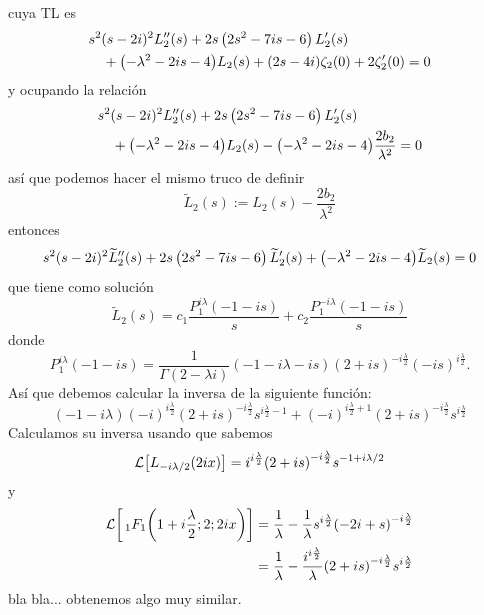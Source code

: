 \documentclass[%
 aip,
 jmp,%
 amsmath,amssymb,
 reprint,%
]{revtex4-2}
\begin{document}
cuya TL es
\begin{equation*}
\begin{aligned}
    & s^2 (s-2 i)^2 L_2''(s)+2 s \left(2 s^2-7 i s-6\right)L_2'(s)\\
    &\quad +\qty(-\lambda^2 - 2is - 4)L_2(s)+\qty(2s - 4i)\zeta_2(0) + 2\zeta_2'(0) = 0
\end{aligned}
\end{equation*}
y ocupando la relación
\begin{equation}
\begin{aligned}
    & s^2 (s-2 i)^2 L_2''(s)+2 s \left(2 s^2-7 i s-6\right)L_2'(s)\\
    &\quad +\qty(-\lambda^2 - 2is - 4)L_2(s) - \qty(- \lambda^2 -2is - 4)\frac{2b_2}{\lambda^2} = 0
\end{aligned}
\end{equation}
así que podemos hacer el mismo truco de definir
\begin{equation}
    \widetilde{L}_2(s) := L_2(s) - \frac{2b_2}{\lambda^2}
\end{equation}
entonces
\begin{equation}
s^2 (s-2 i)^2 \widetilde{L}_2''(s)+2 s \left(2 s^2-7 i s-6\right)\widetilde{L}_2'(s)+\qty(-\lambda^2 - 2is - 4)\widetilde{L}_2(s) = 0
\end{equation}
que tiene como solución
\begin{equation}
    \widetilde{L}_2(s) = c_1\frac{P^{i\lambda}_1(-1-is)}{s} + c_2\frac{P^{-i\lambda}_1(-1-is)}{s}
\end{equation}
donde
\begin{equation}\label{eq:P_1-zeta2}
    P_1^{i\lambda}(-1 - is) = \frac{1}{\Gamma(2 - \lambda i)}(- 1 - i\lambda - is)(2 + is)^{-i\frac{\lambda}{2}}(-is)^{i\frac{\lambda}{2}}.
\end{equation}
Así que debemos calcular la inversa de la siguiente función:
\begin{equation*}
    (-1-i\lambda)(-i)^{i\frac{\lambda}{2}}(2 + is)^{-i\frac{\lambda}{2}}s^{i\frac{\lambda}{2} - 1}  + (-i)^{i\frac{\lambda}{2} + 1}(2 + is)^{-i\frac{\lambda}{2}}s^{i\frac{\lambda}{2}}
\end{equation*}
Calculamos su inversa usando que sabemos
\begin{equation*}
\begin{aligned}
    \mathcal{L}\qty[L_{-i\lambda/2}(2ix)] = i^{i\frac{\lambda}{2}}\qty(2 + is)^{-i\frac{\lambda}{2}}s^{-1 + i\lambda/2}
\end{aligned}
\end{equation*}
y
\begin{equation*}
\begin{aligned}
    \mathcal{L}\qty[\,_1F_1\qty(1+i\frac{\lambda}{2}; 2; 2ix)] &= \frac{1}{\lambda} - \frac{1}{\lambda}s^{i\frac{\lambda}{2}}\qty(-2i + s)^{-i\frac{\lambda}{2}}\\
    &= \frac{1}{\lambda} - \frac{i^{i\frac{\lambda}{2}}}{\lambda}\qty(2 + is)^{-i\frac{\lambda}{2}}s^{i\frac{\lambda}{2}}
\end{aligned}
\end{equation*}
bla bla... obtenemos algo muy similar.
\end{document}
